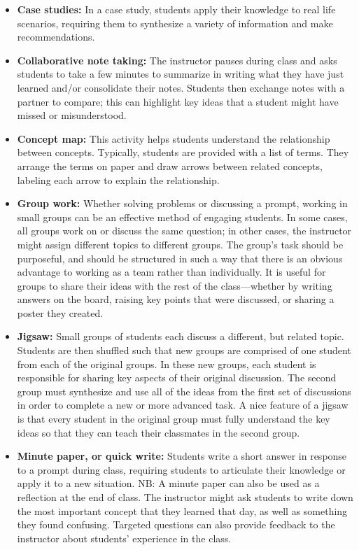 \begin{itemize}
\item \textbf{Case studies:}  In a case study, students apply their knowledge to real life scenarios, requiring them to synthesize a variety of information and make recommendations.
  
\item \textbf{Collaborative note taking:}  The instructor pauses during class and asks students to take a few minutes to summarize in writing what they have just learned and/or consolidate their notes.  Students then exchange notes with a partner to compare; this can highlight key ideas that a student might have missed or misunderstood.
  
\item \textbf{Concept map:}  This activity helps students understand the relationship between concepts. Typically, students are provided with a list of terms.  They arrange the terms on paper and draw arrows between related concepts, labeling each arrow to explain the relationship.
  
\item \textbf{Group work:}  Whether solving problems or discussing a prompt, working in small groups can be an effective method of engaging students.  In some cases, all groups work on or discuss the same question; in other cases, the instructor might assign different topics to different groups.  The group’s task should be purposeful, and should be structured in such a way that there is an obvious advantage to working as a team rather than individually.  It is useful for groups to share their ideas with the rest of the class—whether by writing answers on the board, raising key points that were discussed, or sharing a poster they created.
  
\item \textbf{Jigsaw:}  Small groups of students each discuss a different, but related topic. Students are then shuffled such that new groups are comprised of one student from each of the original groups. In these new groups, each student is responsible for sharing key aspects of their original discussion. The second group must synthesize and use all of the ideas from the first set of discussions in order to complete a new or more advanced task.  A nice feature of a jigsaw is that every student in the original group must fully understand the key ideas so that they can teach their classmates in the second group.  
  
\item \textbf{Minute paper, or quick write:}  Students write a short answer in response to a prompt during class, requiring students to articulate their knowledge or apply it to a new situation.
  NB: A minute paper can also be used as a reflection at the end of class.  The instructor might ask students to write down the most important concept that they learned that day, as well as something they found confusing.  Targeted questions can also provide feedback to the instructor about students’ experience in the class.
  

\end{itemize}
